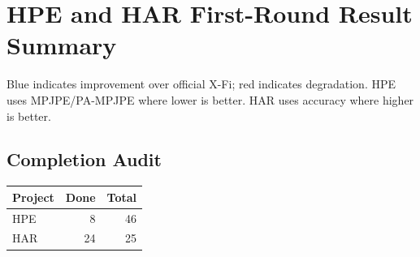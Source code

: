 \documentclass[10pt]{article}
\begin{document}
\section*{HPE and HAR First-Round Result Summary}
Blue indicates improvement over official X-Fi; red indicates degradation. HPE uses MPJPE/PA-MPJPE where lower is better. HAR uses accuracy where higher is better.
\subsection*{Completion Audit}
\begin{tabular}{lrr}
\toprule
Project & Done & Total\\
\midrule
HPE & 8 & 46\\
HAR & 24 & 25\\
\bottomrule
\end{tabular}
\end{document}
